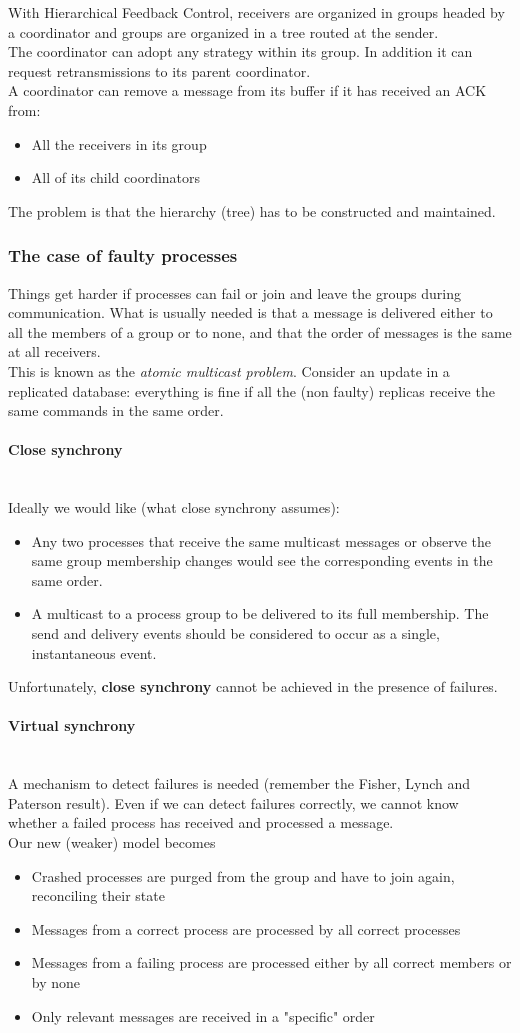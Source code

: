 \documentclass[10pt,a4paper]{article}
\newcommand{\myparagraph}[1]{\paragraph{#1}\mbox{}\\[0.05in]}
\begin{document}
With Hierarchical Feedback Control, receivers are organized in groups headed by a coordinator and groups are organized in a tree routed at the sender. \\
The coordinator can adopt any strategy within its group. In addition it can request retransmissions to its parent coordinator. \\ A coordinator can remove a message from its buffer if it has received an ACK from:
\begin{itemize}
	\item All the receivers in its group
	\item All of its child coordinators
\end{itemize}
The problem is that the hierarchy (tree) has to be constructed and maintained. 
\subsubsection{The case of faulty processes}
Things get harder if processes can fail or join and leave the groups during communication. What is usually needed is that a message is delivered either to all the members of a group or to none, and that the order of messages is the same at all receivers. \\ This is known as the \textit{atomic multicast problem}. Consider an update in a replicated database: everything is fine if all the (non faulty) replicas receive the same commands in the same order.
\myparagraph{Close synchrony}
Ideally we would like (what close synchrony assumes):
\begin{itemize}
	\item Any two processes that receive the same multicast messages or observe the same group membership changes would see the corresponding events in the same order.
	\item  A multicast to a process group to be delivered to its full membership. The send and delivery events should be considered to occur as a single, instantaneous event.
\end{itemize}
Unfortunately, \textbf{close synchrony} cannot be achieved in the presence of failures.
\myparagraph{Virtual synchrony}
A mechanism to detect failures is needed (remember the Fisher, Lynch and Paterson result). Even if we can detect failures correctly, we cannot know whether a failed process has received and processed a message. \\
Our new (weaker) model becomes
\begin{itemize}
	\item Crashed processes are purged from the group and have to join again, reconciling their state
	\item Messages from a correct process are processed by all correct processes
	\item Messages from a failing process are processed either by all correct members or by none
	\item Only relevant messages are received in a "specific" order
\end{itemize}
\end{document}
